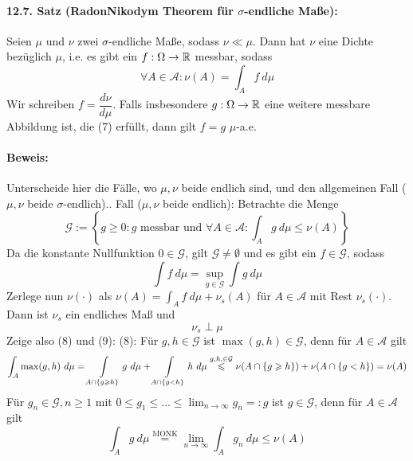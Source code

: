      \paragraph{12.7. Satz (Radon\textendash Nikodym Theorem f\"ur $\sigma$-endliche Ma\ss{}e):} Seien $\mu$ und $\nu$ zwei $\sigma$-endliche Ma\ss{}e, sodass $\nu\ll\mu$. Dann hat $\nu$ eine Dichte bez\"uglich $\mu$, i.e. es gibt ein $f:\Omega\to\mathbb{R}$ messbar, sodass
     \begin{equation}
         \forall A\in\mathcal{A}: \nu(A)=\int_A f \ d\mu
     \end{equation}
     Wir schreiben $f=\dfrac{d\nu}{d\mu}$. Falls insbesondere $g:\Omega\to\mathbb{R}$ eine weitere messbare Abbildung ist, die (7) erf\"ullt, dann gilt $f=g$ $\mu$-a.e.
     
     \paragraph{Beweis:} Unterscheide hier die F\"alle, wo $\mu,\nu$ beide endlich sind, und den allgemeinen Fall ($\mu,\nu$ beide $\sigma$-endlich).\newline{}. Fall ($\mu,\nu$ beide endlich): Betrachte die Menge
     $$\mathcal{G}:=\left\{g\geq0:g \text{ messbar und } \forall A\in\mathcal{A}:\int_A g\ d\mu\leq\nu(A)\right\}$$
     Da die konstante Nullfunktion $0\in\mathcal{G}$, gilt $\mathcal{G}\neq\emptyset$ und es gibt ein $f\in\mathcal{G}$, sodass
     \begin{equation}
         \int f\ d\mu=\sup_{g\in\mathcal{G}}\int g\ d\mu
     \end{equation}
     Zerlege nun $\nu(\cdot)$ als $\nu(A)=\displaystyle\int_A f\ d\mu+\nu_s(A)$ f\"ur $A\in\mathcal{A}$
     mit Rest $\nu_s(\cdot)$. Dann ist $\nu_s$ ein endliches Ma\ss{} und
     \begin{equation}
         \nu_s\perp\mu
     \end{equation}
     Zeige also (8) und (9):\newline
     (8): F\"ur $g,h\in\mathcal{G}$ ist $\max(g,h)\in\mathcal{G}$, denn f\"ur $A\in\mathcal{A}$ gilt
     $$\int_A \max(g,h)\ d\mu=\int\displaylimits_{A\cap\{g\geq h\}}g\ d\mu+\int\displaylimits_{A\cap\{g<h\}}h\ d\mu\overset{g,h,\in\mathcal{G}}{\leq}\nu(A\cap\{g\geq h\})+\nu(A\cap\{g<h\})=\nu(A)$$
     F\"ur $g_n\in\mathcal{G},n\geq1$ mit $0\leq g_1\leq\hdots\leq\lim_{n\to\infty}g_n=:g$ ist $g\in\mathcal{G}$, denn f\"ur $A\in\mathcal{A}$ gilt
     $$\int_A g \ d\mu\overset{\text{MONK}}{=}\lim_{n\to\infty}\int_A g_n\ d\mu\leq\nu(A)$$
